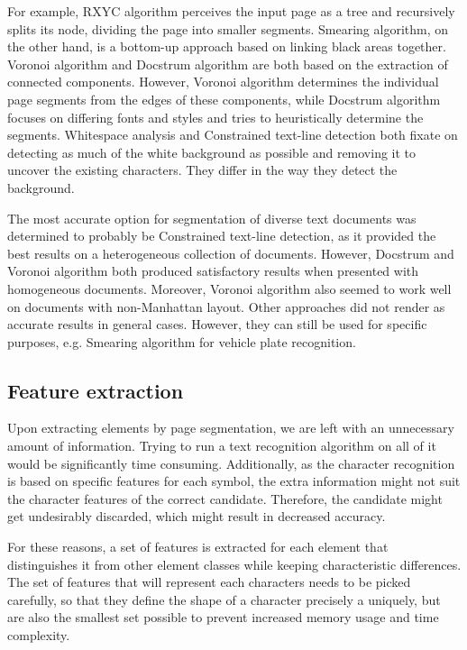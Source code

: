 For example, RXYC algorithm perceives the input page as a tree and recursively splits its node, dividing the page into smaller segments. Smearing algorithm, on the other hand, is a bottom-up approach based on linking black areas together. Voronoi algorithm and Docstrum algorithm are both based on the extraction of connected components. However, Voronoi algorithm determines the individual page segments from the edges of these components, while Docstrum algorithm focuses on differing fonts and styles and tries to heuristically determine the segments. Whitespace analysis and Constrained text-line detection both fixate on detecting as much of the white background as possible and removing it to uncover the existing characters. They differ in the way they detect the background.

The most accurate option for segmentation of diverse text documents was determined to probably be Constrained text-line detection, as it provided the best results on a heterogeneous collection of documents. However, Docstrum and Voronoi algorithm both produced satisfactory results when presented with homogeneous documents. Moreover, Voronoi algorithm also seemed to work well on documents with non-Manhattan layout. Other approaches did not render as accurate results in general cases. However, they can still be used for specific purposes, e.g. Smearing algorithm for vehicle plate recognition.

\subsection{Feature extraction}

Upon extracting elements by page segmentation, we are left with an unnecessary amount of information. Trying to run a text recognition algorithm on all of it would be significantly time consuming. Additionally, as the character recognition is based on specific features for each symbol, the extra information might not suit the character features of the correct candidate. Therefore, the candidate might get undesirably discarded, which might result in decreased accuracy.

For these reasons, a set of features is extracted for each element that distinguishes it from other element classes while keeping characteristic differences. The set of features that will represent each characters needs to be picked carefully, so that they define the shape of a character precisely a uniquely, but are also the smallest set possible to prevent increased memory usage and time complexity.

